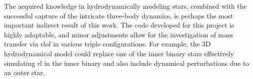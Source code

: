 The acquired knowledge in hydrodynamically modeling stars, combined with the successful capture of the intricate three-body dynamics, is perhaps the most important indirect result of this work. The code developed for this project is highly adaptable, and minor adjustments allow for the investigation of mass transfer via \ac{rlof} in various triple configurations. For example, the 3D hydrodynamical model could replace one of the inner binary stars effectively simulating \ac{rl} in the inner binary and also include dynamical perturbations due to an outer star. 

